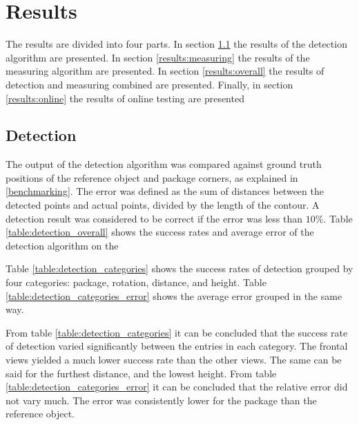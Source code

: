 \chapter{Results} \label{results}
%
%
%
%
%
%
%
%
%

The results are divided into four parts.
In section \ref{results:detection} the results of the detection algorithm are presented.
In section \ref{results:measuring} the results of the measuring algorithm are presented.
In section \ref{results:overall} the results of detection and measuring combined are presented.
Finally, in section \ref{results:online} the results of online testing are presented

\section{Detection} \label{results:detection}
The output of the detection algorithm was compared against ground truth positions of the reference object and package corners, as explained in \ref{benchmarking}.
The error was defined as the sum of distances between the detected points and actual points, divided by the length of the contour.
A detection result was considered to be correct if the error was less than $10\%$.
Table \ref{table:detection_overall} shows the success rates and average error of the detection algorithm on the 



Table \ref{table:detection_categories} shows the success rates of detection grouped by four categories: package, rotation, distance, and height. Table \ref{table:detection_categories_error} shows the average error grouped in the same way.





From table \ref{table:detection_categories} it can be concluded that the success rate of detection varied significantly between the entries in each category.
The frontal views yielded a much lower success rate than the other views.
The same can be said for the furthest distance, and the lowest height. 
From table \ref{table:detection_categories_error} it can be concluded that the relative error did not vary much.
The error was consistently lower for the package than the reference object. %

